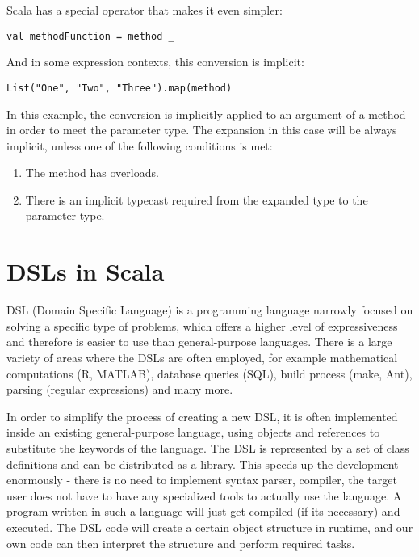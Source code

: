 Scala has a special operator that makes it even simpler:

\lstset{style=Scala}
\begin{lstlisting}
val methodFunction = method _
\end{lstlisting}

And in some expression contexts, this conversion is implicit:

\lstset{style=Scala}
\begin{lstlisting}
List("One", "Two", "Three").map(method)
\end{lstlisting}

In this example, the conversion is implicitly applied to an argument of a method in order to meet the parameter type. The expansion in this case will be always implicit, unless one of the following conditions is met:
\begin{enumerate}
	\item The method has overloads.
	\item There is an implicit typecast required from the expanded type to the parameter type.
\end{enumerate}





\section{DSLs in Scala}
\label{sec:dsls}

DSL (Domain Specific Language) is a programming language narrowly focused on solving a specific type of problems, which offers a higher level of expressiveness and therefore is easier to use than general-purpose languages. There is a large variety of areas where the DSLs are often employed, for example mathematical computations (R, MATLAB), database queries (SQL), build process (make, Ant), parsing (regular expressions) and many more.

In order to simplify the process of creating a new DSL, it is often implemented inside an existing general-purpose language, using objects and references to substitute the keywords of the language. The DSL is represented by a set of class definitions and can be distributed as a library. This speeds up the development enormously - there is no need to implement syntax parser, compiler, the target user does not have to have any specialized tools to actually use the language. A program written in such a language will just get compiled (if its necessary) and executed. The DSL code will create a certain object structure in runtime, and our own code can then interpret the structure and perform required tasks.

